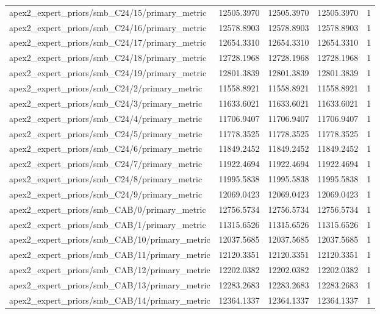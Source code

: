 \begin{table}[h]
\begin{tabular}{lrrrr}
apex2_expert_priors/smb_C24/15/primary_metric & 12505.3970 & 12505.3970 & 12505.3970 & 1 \\
apex2_expert_priors/smb_C24/16/primary_metric & 12578.8903 & 12578.8903 & 12578.8903 & 1 \\
apex2_expert_priors/smb_C24/17/primary_metric & 12654.3310 & 12654.3310 & 12654.3310 & 1 \\
apex2_expert_priors/smb_C24/18/primary_metric & 12728.1968 & 12728.1968 & 12728.1968 & 1 \\
apex2_expert_priors/smb_C24/19/primary_metric & 12801.3839 & 12801.3839 & 12801.3839 & 1 \\
apex2_expert_priors/smb_C24/2/primary_metric & 11558.8921 & 11558.8921 & 11558.8921 & 1 \\
apex2_expert_priors/smb_C24/3/primary_metric & 11633.6021 & 11633.6021 & 11633.6021 & 1 \\
apex2_expert_priors/smb_C24/4/primary_metric & 11706.9407 & 11706.9407 & 11706.9407 & 1 \\
apex2_expert_priors/smb_C24/5/primary_metric & 11778.3525 & 11778.3525 & 11778.3525 & 1 \\
apex2_expert_priors/smb_C24/6/primary_metric & 11849.2452 & 11849.2452 & 11849.2452 & 1 \\
apex2_expert_priors/smb_C24/7/primary_metric & 11922.4694 & 11922.4694 & 11922.4694 & 1 \\
apex2_expert_priors/smb_C24/8/primary_metric & 11995.5838 & 11995.5838 & 11995.5838 & 1 \\
apex2_expert_priors/smb_C24/9/primary_metric & 12069.0423 & 12069.0423 & 12069.0423 & 1 \\
apex2_expert_priors/smb_CAB/0/primary_metric & 12756.5734 & 12756.5734 & 12756.5734 & 1 \\
apex2_expert_priors/smb_CAB/1/primary_metric & 11315.6526 & 11315.6526 & 11315.6526 & 1 \\
apex2_expert_priors/smb_CAB/10/primary_metric & 12037.5685 & 12037.5685 & 12037.5685 & 1 \\
apex2_expert_priors/smb_CAB/11/primary_metric & 12120.3351 & 12120.3351 & 12120.3351 & 1 \\
apex2_expert_priors/smb_CAB/12/primary_metric & 12202.0382 & 12202.0382 & 12202.0382 & 1 \\
apex2_expert_priors/smb_CAB/13/primary_metric & 12283.2683 & 12283.2683 & 12283.2683 & 1 \\
apex2_expert_priors/smb_CAB/14/primary_metric & 12364.1337 & 12364.1337 & 12364.1337 & 1 \\

\end{tabular}
\end{table}
